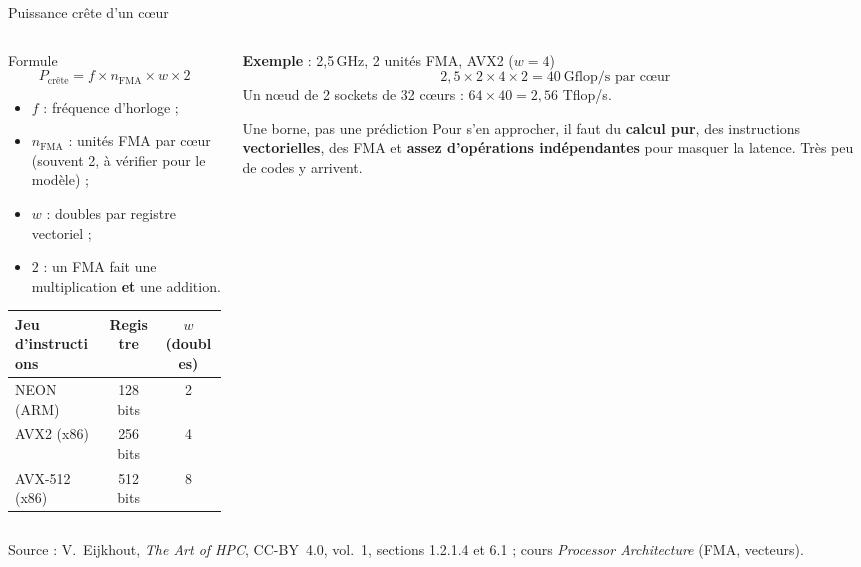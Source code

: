 \documentclass[8pt,aspectratio=169]{beamer}
\newcommand{\src}[1]{\vfill{\tiny\color{gray}Source : #1\par}}
\newcommand{\eij}{V.~Eijkhout, \emph{The Art of HPC}, CC-BY~4.0}
\begin{document}
\begin{frame}{Puissance crête d'un cœur}
\begin{columns}[T]
\begin{column}{0.5\textwidth}
\begin{block}{Formule}
\[
P_{\text{crête}} = f \times n_{\text{FMA}} \times w \times 2
\]
\end{block}
\begin{itemize}
\item $f$ : fréquence d'horloge ;
\item $n_{\text{FMA}}$ : unités FMA par cœur (souvent 2, à vérifier pour le modèle) ;
\item $w$ : doubles par registre vectoriel ;
\item $2$ : un FMA fait une multiplication \textbf{et} une addition.
\end{itemize}

\medskip
\begin{tabular}{@{}lcc@{}}
\toprule
Jeu d'instructions & Registre & $w$ (doubles)\\
\midrule
NEON (ARM) & 128 bits & 2\\
AVX2 (x86) & 256 bits & 4\\
AVX-512 (x86) & 512 bits & 8\\
\bottomrule
\end{tabular}
\end{column}
\begin{column}{0.46\textwidth}
\textbf{Exemple} : 2,5\,GHz, 2 unités FMA, AVX2 ($w=4$)
\[
2{,}5 \times 2 \times 4 \times 2 = 40\ \text{Gflop/s par cœur}
\]
Un nœud de 2 sockets de 32 cœurs : $64 \times 40 = 2{,}56$ Tflop/s.

\medskip
\begin{alertblock}{Une borne, pas une prédiction}
Pour s'en approcher, il faut du \textbf{calcul pur}, des instructions \textbf{vectorielles}, des FMA et \textbf{assez d'opérations indépendantes} pour masquer la latence. Très peu de codes y arrivent.
\end{alertblock}
\end{column}
\end{columns}
\src{\eij{}, vol.~1, sections 1.2.1.4 et 6.1 ; cours \emph{Processor Architecture} (FMA, vecteurs).}
\end{frame}
\end{document}

